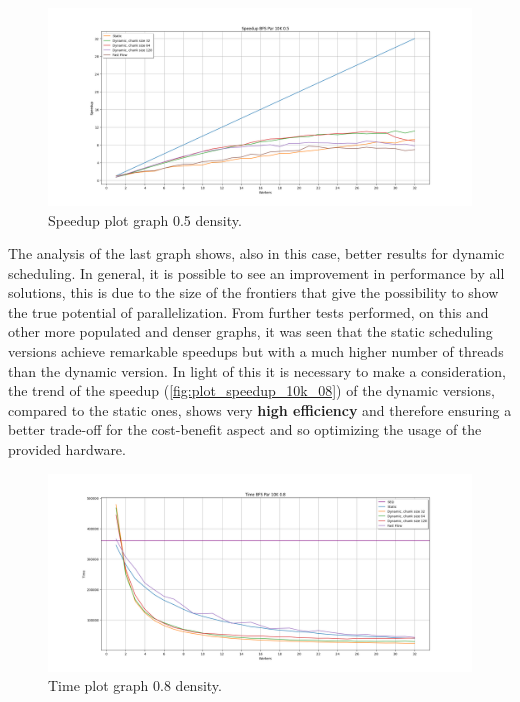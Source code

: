 \begin{figure}[htb!]
    \centering
    \includegraphics[width=\textwidth]{Figures/plot_map_speedup_vs10K05.png}
    \caption{Speedup plot graph 0.5 density.}
    \label{fig:plot_speedup_10k_05}
\end{figure}
\FloatBarrier

The analysis of the last graph shows, also in this case, better results for dynamic scheduling. In general, it is possible to see an improvement in performance by all solutions, this is due to the size of the frontiers that give the possibility to show the true potential of parallelization. From further tests performed, on this and other more populated and denser graphs, it was seen that the static scheduling versions achieve remarkable speedups but with a much higher number of threads than the dynamic version. In light of this it is necessary to make a consideration, the trend of the speedup (\ref{fig:plot_speedup_10k_08}) of the dynamic versions, compared to the static ones, shows very \textbf{high efficiency} and therefore ensuring a better trade-off for the cost-benefit aspect and so optimizing the usage of the provided hardware.

\begin{figure}[htb!]
    \centering
    \includegraphics[width=\textwidth]{Figures/plot_map_time_vs10K08.png}
    \caption{Time plot graph 0.8 density.}
    \label{fig:plot_time_10k_08}
\end{figure}
\FloatBarrier

